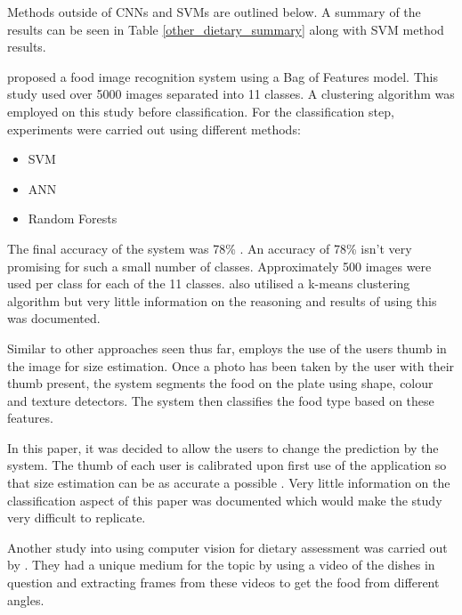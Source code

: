 Methods outside of CNNs and SVMs are outlined below.
A summary of the results can be seen in Table \ref{other_dietary_summary} along with SVM method results.

\parencite{LSL_2015} proposed a food image recognition system using a Bag of Features model.
This study used over 5000 images separated into 11 classes.
A clustering algorithm was employed on this study before classification.
For the classification step, experiments were carried out using different methods:
\begin{itemize}
	\item{SVM}
	\item{ANN}
	\item{Random Forests}
\end{itemize}

The final accuracy of the system was 78\% \parencite{LSL_2015}.
An accuracy of 78\% isn't very promising for such a small number of classes.
Approximately 500 images were used per class for each of the 11 classes.
\parencite{LSL_2015} also utilised a k-means clustering algorithm but very little information on the reasoning and results of using this was documented.


Similar to other approaches seen thus far, \parencite{personalAssistive} employs the use of the users thumb in the image for size estimation.
Once a photo has been taken by the user with their thumb present, the system segments the food on the plate using shape, colour and texture detectors.
The system then classifies the food type based on these features.

In this paper, it was decided to allow the users to change the prediction by the system.
The thumb of each user is calibrated upon first use of the application so that size estimation can be as accurate a possible \parencite{personalAssistive}.
Very little information on the classification aspect of this paper was documented which would make the study very difficult to replicate. 

Another study into using computer vision for dietary assessment was carried out by \parencite{chen2010toward}. They had a unique medium for the topic by using a video of the dishes in question and extracting frames from these videos to get the food from different angles.

